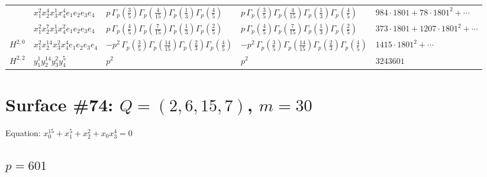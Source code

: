 \documentclass[11pt]{article}
\begin{document}
\begin{table}[ht]
{\begin{tabular}{@{}lllll@{}}
 & $x_{1}^{2} x_{2}^{4} x_{3}^{1} x_{4}^{4}  e_{1} e_{2} e_{3} e_{4}$ & $p \, \Gamma_p \left( \frac{3}{5} \right) \Gamma_p \left( \frac{4}{15} \right) \Gamma_p \left( \frac{1}{3} \right) \Gamma_p \left( \frac{4}{5} \right)$ & $p \, \Gamma_p \left( \frac{3}{5} \right) \Gamma_p \left( \frac{4}{15} \right) \Gamma_p \left( \frac{1}{3} \right) \Gamma_p \left( \frac{4}{5} \right)$ & $984{\cdot}1801{+}78{\cdot}1801^{2}{+}\cdots$ \\
 & $x_{1}^{2} x_{2}^{7} x_{3}^{1} x_{4}^{2}  e_{1} e_{2} e_{3} e_{4}$ & $p \, \Gamma_p \left( \frac{4}{5} \right) \Gamma_p \left( \frac{7}{15} \right) \Gamma_p \left( \frac{1}{3} \right) \Gamma_p \left( \frac{2}{5} \right)$ & $p \, \Gamma_p \left( \frac{4}{5} \right) \Gamma_p \left( \frac{7}{15} \right) \Gamma_p \left( \frac{1}{3} \right) \Gamma_p \left( \frac{2}{5} \right)$ & $373{\cdot}1801{+}1207{\cdot}1801^{2}{+}\cdots$ \\
\midrule
$H^{2,0}$ & $x_{1}^{2} x_{2}^{14} x_{3}^{2} x_{4}^{4}  e_{1} e_{2} e_{3} e_{4}$ & $- p^{2} \, \Gamma_p \left( \frac{3}{5} \right) \Gamma_p \left( \frac{14}{15} \right) \Gamma_p \left( \frac{2}{3} \right) \Gamma_p \left( \frac{4}{5} \right)$ & $- p^{2} \, \Gamma_p \left( \frac{3}{5} \right) \Gamma_p \left( \frac{14}{15} \right) \Gamma_p \left( \frac{2}{3} \right) \Gamma_p \left( \frac{4}{5} \right)$ & $1415{\cdot}1801^{2}{+}\cdots$ \\
\midrule
$H^{2,2}$ & $y_{1}^{1} y_{2}^{14} y_{3}^{2} y_{4}^{5}$ & $p^{2} \,$ & $p^{2} \,$ & $3243601$ \\
\bottomrule
\end{tabular}
}
\renewcommand{\arraystretch}{1.0}
\end{table}

\newpage

\section*{Surface \#74: $Q=(2, 6, 15, 7)$, $m=30$}

Equation: $x_0^{15} + x_1^{5} + x_2^{2} + x_0 x_3^{4} = 0$

\subsection*{$p = 601$}
\end{document}
